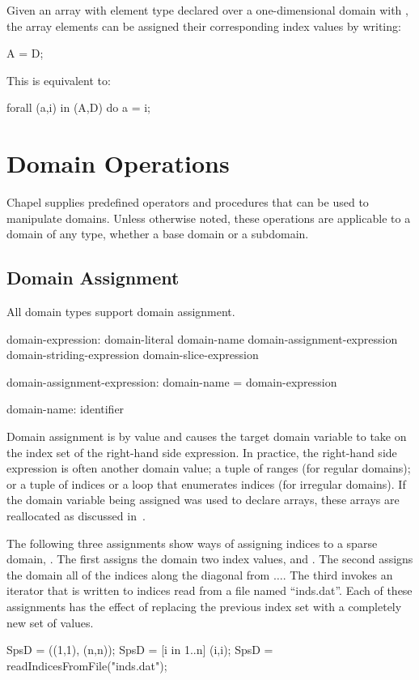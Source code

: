 \begin{example}
Given an array  with element type  declared over a
one-dimensional domain  with  , the
array elements can be assigned their corresponding index values by
writing:
\begin{chapel}
A = D;
\end{chapel}
This is equivalent to:
\begin{chapel}
forall (a,i) in (A,D) do
  a = i;
\end{chapel}
\end{example}


\section{Domain Operations}

Chapel supplies predefined operators and procedures that can be used to manipulate
domains.  Unless otherwise noted, these operations are applicable to a domain of
any type, whether a base domain or a subdomain.

\subsection{Domain Assignment}
\label{Domain_Assignment}

All domain types support domain assignment.  

\begin{syntax}
domain-expression:
  domain-literal
  domain-name
  domain-assignment-expression
  domain-striding-expression
  domain-slice-expression


domain-assignment-expression:
  domain-name = domain-expression

domain-name:
  identifier
\end{syntax}

Domain assignment is by
value and causes the target domain variable to take on the index set
of the right-hand side expression.  In practice, the right-hand side
expression is often another domain value; a tuple of ranges (for
regular domains); or a tuple of indices or a loop that enumerates
indices (for irregular domains).  If the domain variable being
assigned was used to declare arrays, these arrays are reallocated as
discussed in~.

\begin{example}
The following three assignments show ways of assigning indices to a
sparse domain, .  The first assigns the domain two index
values,  and .  The second assigns the domain
all of the indices along the diagonal from
$\ldots$.  The third invokes an iterator that
is written to  indices read from a file named
``inds.dat''.  Each of these assignments has the effect of replacing
the previous index set with a completely new set of values.
\begin{chapel}
SpsD = ((1,1), (n,n));
SpsD = [i in 1..n] (i,i);
SpsD = readIndicesFromFile("inds.dat");
\end{chapel}
\end{example}

